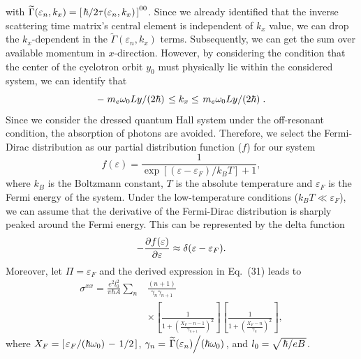 \documentclass[
 reprint,
 amsmath,amssymb,
 aps,
 prb,
]{revtex4-2}
\begin{document}
with $\widetilde{{\Gamma}}(\varepsilon_n,k_x) = \left[\flatfrac{\hbar}{2\tau(\varepsilon_n,k_x)}\right]^{00}$. Since we already identified that the inverse scattering time matrix's central element is independent of $k_x$ value, we can drop the $k_x$-dependent in the $\widetilde{{\Gamma}}(\varepsilon_n,k_x)$ terms. Subsequently, we can get the sum over available momentum in $x$-direction.
However, by considering the condition that the center of the cyclotron orbit $y_0$ must physically lie within the considered system, we can identify that
\begin{equation} \label{eq:32}
 -\flatfrac{m_e\omega_0 Ly}{(2\hbar)} \leq k_x \leq \flatfrac{m_e\omega_0 Ly}{(2\hbar)}.
\end{equation}
{\color{Red}
Since we consider the dressed quantum Hall system under the off-resonant condition, the absorption of photons are avoided. Therefore, we select the Fermi-Dirac distribution as our partial distribution function ($f$) for our system
\begin{equation} \label{eq:33}
  f(\varepsilon) = \frac{1}{\exp[(\varepsilon - \varepsilon_F)/k_B T]+1},
\end{equation}
where $k_B$ is the Boltzmann constant, $T$ is the absolute temperature and $\varepsilon_F$ is the Fermi energy of the system. Under the low-temperature conditions ($k_BT \ll \varepsilon_F$), we can assume that the derivative of the Fermi-Dirac distribution is sharply peaked around the Fermi energy. This can be represented by the delta function \cite{endo09}
\begin{equation} \label{eq:34}
  - \pdv{f(\varepsilon)}{\varepsilon} \approx \delta(\varepsilon - \varepsilon_F).
\end{equation}
Moreover, let $\Pi = \varepsilon_F$ and the derived expression in Eq.~(31) leads to
\begin{equation} \label{eq:35}
  \begin{aligned}
    \sigma^{xx}  =
    \frac{e^2l_0^2}{\pi\hbar A}
    \sum_{n} &
    \frac{(n+1)}{\gamma_{n}\gamma_{n+1}} \\
    &\times
    \left[
      \frac{1}
      {
        1 + \left(\frac{X_F - n -1}{\gamma_{n+1}}\right)^2
      }
    \right]
    \left[
      \frac{1}
      {
        1 + \left(\frac{X_F - n}{\gamma_{n}}\right)^2
      }
    \right],
  \end{aligned}
\end{equation}
where $X_F = \left[\flatfrac{\varepsilon_F}{(\hbar \omega_0)} - \flatfrac{1}{2}\right]$,
$\gamma_n = \flatfrac{\widetilde{{\Gamma}}(\varepsilon_n)}{(\hbar \omega_0)}$, and $l_0 = \sqrt{\flatfrac{\hbar}{eB}}$.
}
\end{document}
